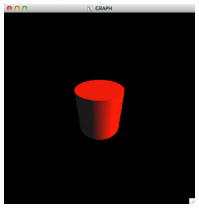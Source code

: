 \documentclass[platex,a4paper,12pt]{jsarticle}%
\begin{document}
\begin{figure}[htb]
\centering
\includegraphics[width=100mm]{Canvas_g_cylinder.eps}
\end{figure}




\end{document}

